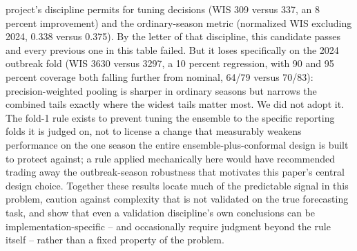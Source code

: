 \documentclass[11pt]{article}
\begin{document}
project's discipline permits for tuning decisions (WIS 309 versus 337, an 8 percent improvement)
and the ordinary-season metric (normalized WIS excluding 2024, 0.338 versus 0.375). By the letter
of that discipline, this candidate passes and every previous one in this table failed. But it loses
specifically on the 2024 outbreak fold (WIS 3630 versus 3297, a 10 percent regression, with 90 and
95 percent coverage both falling further from nominal, 64/79 versus 70/83): precision-weighted
pooling is sharper in ordinary seasons but narrows the combined tails exactly where the widest
tails matter most. We did not adopt it. The fold-1 rule exists to prevent tuning the ensemble to
the specific reporting folds it is judged on, not to license a change that measurably weakens
performance on the one season the entire ensemble-plus-conformal design is built to protect
against; a rule applied mechanically here would have recommended trading away the outbreak-season
robustness that motivates this paper's central design choice. Together these
results locate much of the predictable signal in this problem, caution against complexity that is
not validated on the true forecasting task, and show that even a validation discipline's own
conclusions can be implementation-specific -- and occasionally require judgment beyond the rule
itself -- rather than a fixed property of the problem.
\end{document}
